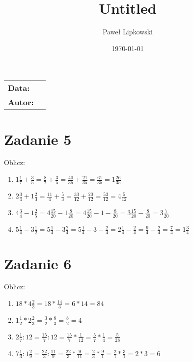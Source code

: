 \documentclass[letterpaper,12pt]{article}
\author{Paweł Lipkowski}
\title{Untitled}
\date{\today} %
\begin{document}
       	
	\begin{tabular}{l p{2.5in}}
		\textbf{Data:}  & \thedate \\
		\textbf{Autor:} & \theauthor \\
	\end{tabular}
   	
    \section{Zadanie 5}
    Oblicz:
    \begin{enumerate}[label=\alph*)]
        \item $ 1\frac{1}{7} + \frac{3}{5} = %
       		\frac{8}{7} + \frac{3}{5} = %
        	\frac{40}{35} + \frac{21}{35} = %
        	\frac{61}{35} = 1\frac{26}{35} $
        \item $2\frac{3}{4} + 1\frac{2}{3} = %
        	\frac{11}{4} + \frac{5}{3} = %
        	\frac{33}{12} + \frac{20}{12} = %
        	\frac{53}{12} = 4\frac{5}{12}$
        \item $4\frac{3}{4} - 1\frac{2}{5} =%
        	4\frac{15}{20} - 1\frac{8}{20} =%
        	4\frac{15}{20} - 1 - \frac{8}{20} =%
        	3\frac{15}{20} - \frac{8}{20} =%
        	3\frac{7}{20} $
        \item $5\frac{1}{4} - 3\frac{1}{2} = %
        	5\frac{1}{4} - 3\frac{2}{4} = %
        	5\frac{1}{4} - 3 - \frac{2}{4} = %
        	2\frac{1}{4} - \frac{2}{4} = %
        	\frac{9}{4} - \frac{2}{4} = \frac{7}{4} = 1\frac{3}{4}$
    \end{enumerate}
    \section{Zadanie 6}
    Oblicz:
    \begin{enumerate}[label=\alph*)]
    	\item $18 * 4\frac{2}{3} = %
    		18 * \frac{14}{3} = %
    		6 * 14 = 84$
    	\item $1\frac{1}{2} * 2\frac{2}{3} = %
    		\frac{3}{2} * \frac{8}{3} = %
    		\frac{8}{2} = 4 $
    	\item $ 2\frac{1}{7} : 12 = %
    		\frac{15}{7} : 12 = %
    		\frac{15}{7} * \frac{1}{12} = %
    		\frac{5}{7} * \frac{1}{4} = \frac{5}{28} $
    	\item $ 7\frac{1}{3} : 1\frac{2}{9} = %
    		\frac{22}{3} : \frac{11}{9} = %
    		\frac{22}{3} * \frac{9}{11} = %
    		\frac{2}{3} * \frac{9}{1} = %
    		\frac{2}{1} * \frac{3}{1} = %
    		2 * 3 = 6$
    \end{enumerate}
\end{document}
